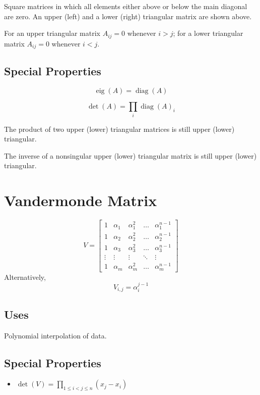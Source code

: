 \documentclass{book}
\DeclareMathOperator{\diag}{diag}
\DeclareMathOperator{\eig}{eig}
\begin{document}
Square matrices in which all elements either above or below the main diagonal are zero. An upper (left) and a lower (right) triangular matrix are shown above.

For an upper triangular matrix $A_{ij}=0$ whenever $i>j$; for a lower triangular matrix $A_{ij}=0$ whenever $i<j$.


\subsection*{Special Properties}

\begin{equation}
\eig(A)=\diag(A) 
\end{equation}

\begin{equation}
\det(A)=\prod_i \diag(A)_i
\end{equation}

The product of two upper (lower) triangular matrices is still upper (lower) triangular.

The inverse of a nonsingular upper (lower) triangular matrix is still upper (lower) triangular.




\section{Vandermonde Matrix}
\begin{equation}
V=
\begin{bmatrix}
1      & \alpha_1 & \alpha_1^2 & \dots  & \alpha_1^{n-1} \\
1      & \alpha_2 & \alpha_2^2 & \dots  & \alpha_2^{n-1} \\
1      & \alpha_3 & \alpha_3^2 & \dots  & \alpha_3^{n-1} \\
\vdots & \vdots   & \vdots     & \ddots & \vdots         \\
1      & \alpha_m & \alpha_m^2 & \dots  & \alpha_m^{n-1}
\end{bmatrix}
\end{equation}
Alternatively,
\begin{equation}
V_{i,j} = \alpha_i^{j-1}
\end{equation}

\subsection*{Uses}
Polynomial interpolation of data.

\subsection*{Special Properties}
\begin{itemize}
\item $\det(V)=\prod_{1\le i < j \le n} (x_j-x_i)$
\end{itemize}
\end{document}
